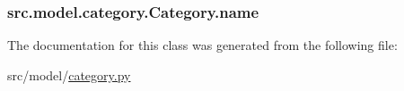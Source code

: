 \subsubsection[{name}]{\setlength{\rightskip}{0pt plus 5cm}src.\+model.\+category.\+Category.\+name}\label{classsrc_1_1model_1_1category_1_1Category_ac1f8913b5d11d768cb48cde2760f8322}


The documentation for this class was generated from the following file\+:\begin{DoxyCompactItemize}
\item 
src/model/\hyperlink{category_8py}{category.\+py}\end{DoxyCompactItemize}
